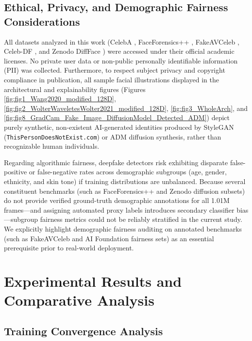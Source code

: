 \documentclass[fleqn,10pt]{wlscirep}
\begin{document}
\subsection*{Ethical, Privacy, and Demographic Fairness Considerations}
All datasets analyzed in this work (CelebA \cite{ref36}, FaceForensics++ \cite{ref12}, FakeAVCeleb \cite{ref11}, Celeb-DF \cite{ref37}, and Zenodo DiffFace \cite{ref9, ref10}) were accessed under their official academic licenses. No private user data or non-public personally identifiable information (PII) was collected. Furthermore, to respect subject privacy and copyright compliance in publication, all sample facial illustrations displayed in the architectural and explainability figures (Figures \ref{fig:fig1_Wang2020_modified_128D}, \ref{fig:fig2_WolterWaveletesWolter2021_modified_128D}, \ref{fig:fig3_WholeArch}, and \ref{fig:fig8_GradCam_Fake_Image_DiffusionModel_Detected_ADM}) depict purely synthetic, non-existent AI-generated identities produced by StyleGAN (\texttt{ThisPersonDoesNotExist.com}) or ADM diffusion synthesis, rather than recognizable human individuals.

Regarding algorithmic fairness, deepfake detectors risk exhibiting disparate false-positive or false-negative rates across demographic subgroups (age, gender, ethnicity, and skin tone) if training distributions are unbalanced. Because several constituent benchmarks (such as FaceForensics++ and Zenodo diffusion subsets) do not provide verified ground-truth demographic annotations for all 1.01M frames---and assigning automated proxy labels introduces secondary classifier bias---subgroup fairness metrics could not be reliably stratified in the current study. We explicitly highlight demographic fairness auditing on annotated benchmarks (such as FakeAVCeleb and AI Foundation fairness sets) as an essential prerequisite prior to real-world deployment.

\section*{Experimental Results and Comparative Analysis}
\subsection*{Training Convergence Analysis}
\end{document}
